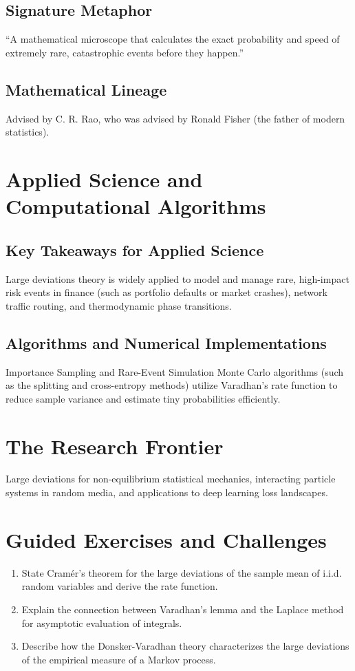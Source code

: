 \subsection{Signature Metaphor}
``A mathematical microscope that calculates the exact probability and speed of extremely rare, catastrophic events before they happen.''

\subsection{Mathematical Lineage}
Advised by C. R. Rao, who was advised by Ronald Fisher (the father of modern statistics).

\section{Applied Science and Computational Algorithms}
\subsection{Key Takeaways for Applied Science}
Large deviations theory is widely applied to model and manage rare, high-impact risk events in finance (such as portfolio defaults or market crashes), network traffic routing, and thermodynamic phase transitions.

\subsection{Algorithms and Numerical Implementations}
Importance Sampling and Rare-Event Simulation Monte Carlo algorithms (such as the splitting and cross-entropy methods) utilize Varadhan's rate function to reduce sample variance and estimate tiny probabilities efficiently.

\section{The Research Frontier}
Large deviations for non-equilibrium statistical mechanics, interacting particle systems in random media, and applications to deep learning loss landscapes.

\section{Guided Exercises and Challenges}
\begin{enumerate}[label=\textbf{\arabic*.}]
  \item State Cram\'er's theorem for the large deviations of the sample mean of i.i.d. random variables and derive the rate function.
  \item Explain the connection between Varadhan's lemma and the Laplace method for asymptotic evaluation of integrals.
  \item Describe how the Donsker-Varadhan theory characterizes the large deviations of the empirical measure of a Markov process.
\end{enumerate}


